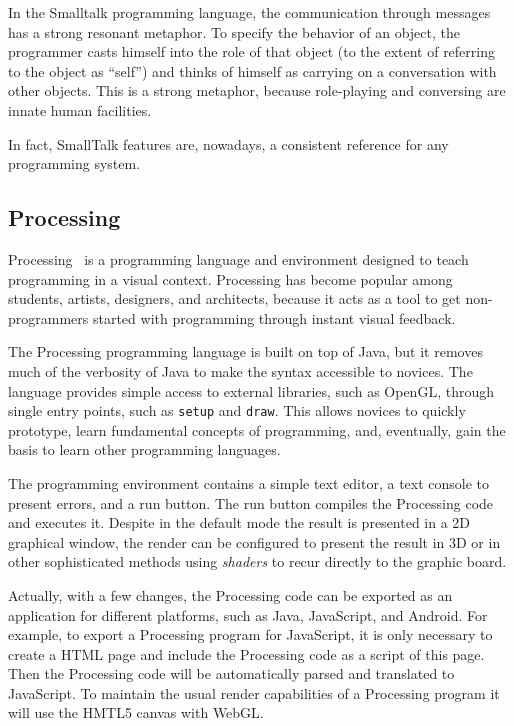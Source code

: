 In the Smalltalk programming language, the communication through messages has a strong resonant metaphor. To specify the behavior of an object, the programmer casts himself into the role of that object (to the extent of referring to the object as ``self'') and thinks of himself as carrying on a conversation with other objects. This is a strong metaphor, because role-playing and conversing are innate human facilities. 

In fact, SmallTalk features are, nowadays, a consistent reference for any programming system.
\subsection{Processing}
\label{subsec:processing}
Processing~\citep{Reas2006} is a programming language and environment designed to teach programming in a visual context. Processing has become popular among students, artists, designers, and architects, because it acts as a tool to get non-programmers started with programming through instant visual feedback.

The Processing programming language is built on top of Java, but it removes much of the verbosity of Java to make the syntax accessible to novices. The language provides simple access to external libraries, such as OpenGL, through single entry points, such as \texttt{setup} and \texttt{draw}. This allows novices to quickly prototype, learn fundamental concepts of programming, and, eventually, gain the basis to learn other programming languages.

The programming environment contains a simple text editor, a text console to present errors, and a run button. The run button compiles the Processing code and executes it. Despite in the default mode the result is presented in a 2D graphical window, the render can be configured to present the result in 3D or in other sophisticated methods using \textit{shaders} to recur directly to the graphic board.

Actually, with a few changes, the Processing code can be exported as an application for different platforms, such as Java, JavaScript, and Android. For example, to export a Processing program for JavaScript, it is only necessary to create a HTML page and include the Processing code as a script of this page. Then the Processing code will be automatically parsed and translated to JavaScript. To maintain the usual render capabilities of a Processing program it will use the HMTL5 canvas with WebGL.

